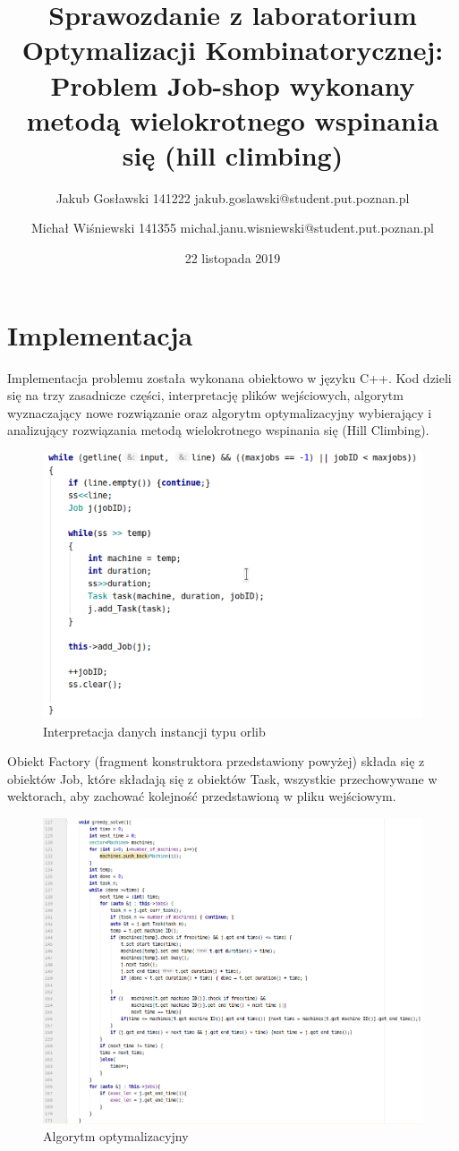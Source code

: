 \documentclass[]{article}
\author{Jakub Gosławski 141222 jakub.goslawski@student.put.poznan.pl 
\and Michał Wiśniewski 141355 michal.janu.wisniewski@student.put.poznan.pl}
\date{22 listopada 2019}
\title{Sprawozdanie z laboratorium Optymalizacji Kombinatorycznej: 
\newline Problem Job-shop wykonany metodą wielokrotnego wspinania się (hill climbing)}
\begin{document}
	\maketitle
	
	\section{Implementacja}
	Implementacja problemu została wykonana obiektowo w języku C++.
	Kod dzieli się na trzy zasadnicze części, interpretację plików wejściowych, algorytm wyznaczający nowe rozwiązanie oraz algorytm optymalizacyjny wybierający i analizujący rozwiązania metodą wielokrotnego wspinania się (Hill Climbing).
	
	\begin{figure}[h!]
		\centering
		\includegraphics[width=0.5\linewidth]{orlib}
		\caption{Interpretacja danych instancji typu orlib}
	\end{figure}

	Obiekt Factory (fragment konstruktora przedstawiony powyżej) składa się z obiektów Job, które składają się z obiektów Task, wszystkie przechowywane w wektorach, aby zachować kolejność przedstawioną w pliku wejściowym.\\
	
	
	\begin{figure}[h!]
		\includegraphics[width=1\linewidth]{greedy}
		\caption{Algorytm optymalizacyjny}
	\end{figure}
\end{document}
